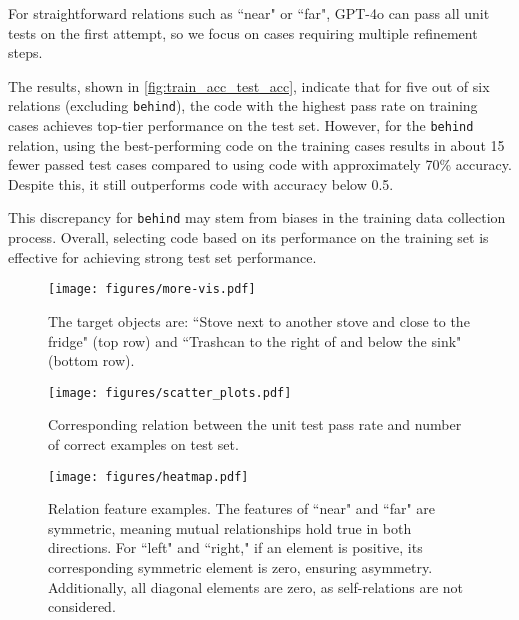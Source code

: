 For straightforward relations such as ``near" or ``far", GPT-4o can pass all unit tests on the first attempt, so we focus on cases requiring multiple refinement steps.

The results, shown in \autoref{fig:train_acc_test_acc}, indicate that for five out of six relations (excluding \texttt{behind}), the code with the highest pass rate on training cases achieves top-tier performance on the test set. However, for the \texttt{behind} relation, using the best-performing code on the training cases results in about 15 fewer passed test cases compared to using code with approximately 70\% accuracy. Despite this, it still outperforms code with accuracy below 0.5.

This discrepancy for \texttt{behind} may stem from biases in the training data collection process. Overall, selecting code based on its performance on the training set is effective for achieving strong test set performance.






\begin{figure*}
    \centering
    \texttt{[image: figures/more-vis.pdf]}
    \caption{The target objects are: ``Stove next to another stove and close to the fridge" (top row) and ``Trashcan to the right of and below the sink" (bottom row).}
    \label{fig:more_vis}
\end{figure*}

\begin{figure*}
    \centering
    \texttt{[image: figures/scatter\_plots.pdf]}
    \caption{Corresponding relation between the unit test pass rate and number of correct examples on test set.}
    \label{fig:train_acc_test_acc}
\end{figure*}





\begin{figure*}
    \centering
    \texttt{[image: figures/heatmap.pdf]}
    \caption{Relation feature examples. The features of ``near" and ``far" are symmetric, meaning mutual relationships hold true in both directions. For ``left" and ``right," if an element is positive, its corresponding symmetric element is zero, ensuring asymmetry. Additionally, all diagonal elements are zero, as self-relations are not considered.}
    \label{fig:heatmap}
\end{figure*}


